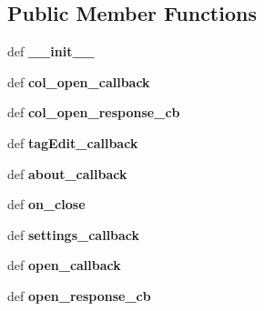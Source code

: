 \subsection*{Public Member Functions}
\begin{DoxyCompactItemize}
\item 
\hypertarget{classfile__choose_1_1MyWindow_af8c708b0d8e2512b072e2ee1bbc9f451}{def {\bfseries \-\_\-\-\_\-init\-\_\-\-\_\-}}\label{classfile__choose_1_1MyWindow_af8c708b0d8e2512b072e2ee1bbc9f451}

\item 
\hypertarget{classfile__choose_1_1MyWindow_a63b62c9877155f404c8d2e52f11bd4a1}{def {\bfseries col\-\_\-open\-\_\-callback}}\label{classfile__choose_1_1MyWindow_a63b62c9877155f404c8d2e52f11bd4a1}

\item 
\hypertarget{classfile__choose_1_1MyWindow_abbf1e62125800a6f77d01e1969f0d244}{def {\bfseries col\-\_\-open\-\_\-response\-\_\-cb}}\label{classfile__choose_1_1MyWindow_abbf1e62125800a6f77d01e1969f0d244}

\item 
\hypertarget{classfile__choose_1_1MyWindow_aad68d56fb137fd447af9f00cb72498e5}{def {\bfseries tag\-Edit\-\_\-callback}}\label{classfile__choose_1_1MyWindow_aad68d56fb137fd447af9f00cb72498e5}

\item 
\hypertarget{classfile__choose_1_1MyWindow_a8abee8fa3a386dd3d050a375fcaf7cc9}{def {\bfseries about\-\_\-callback}}\label{classfile__choose_1_1MyWindow_a8abee8fa3a386dd3d050a375fcaf7cc9}

\item 
\hypertarget{classfile__choose_1_1MyWindow_a03a0640597255bbaaaeb575647ea532a}{def {\bfseries on\-\_\-close}}\label{classfile__choose_1_1MyWindow_a03a0640597255bbaaaeb575647ea532a}

\item 
\hypertarget{classfile__choose_1_1MyWindow_a73c239c17441a806d7dffc3fa238b202}{def {\bfseries settings\-\_\-callback}}\label{classfile__choose_1_1MyWindow_a73c239c17441a806d7dffc3fa238b202}

\item 
\hypertarget{classfile__choose_1_1MyWindow_a20f9cada43f8367464961d520da0db1e}{def {\bfseries open\-\_\-callback}}\label{classfile__choose_1_1MyWindow_a20f9cada43f8367464961d520da0db1e}

\item 
\hypertarget{classfile__choose_1_1MyWindow_a17094ace9e248e5f97e295cc50ca6ec2}{def {\bfseries open\-\_\-response\-\_\-cb}}\label{classfile__choose_1_1MyWindow_a17094ace9e248e5f97e295cc50ca6ec2}


\end{DoxyCompactItemize}
